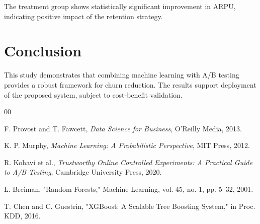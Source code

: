 \documentclass[conference]{IEEEtran}
\begin{document}
The treatment group shows statistically significant improvement in ARPU, indicating positive impact of the retention strategy.

\section{Conclusion}
This study demonstrates that combining machine learning with A/B testing provides a robust framework for churn reduction. The results support deployment of the proposed system, subject to cost-benefit validation.


\begin{thebibliography}{00}

 F. Provost and T. Fawcett, \textit{Data Science for Business}, O'Reilly Media, 2013.

 K. P. Murphy, \textit{Machine Learning: A Probabilistic Perspective}, MIT Press, 2012.

 R. Kohavi et al., \textit{Trustworthy Online Controlled Experiments: A Practical Guide to A/B Testing}, Cambridge University Press, 2020.

 L. Breiman, "Random Forests," Machine Learning, vol. 45, no. 1, pp. 5--32, 2001.

 T. Chen and C. Guestrin, "XGBoost: A Scalable Tree Boosting System," in Proc. KDD, 2016.

\end{thebibliography}
\end{document}
